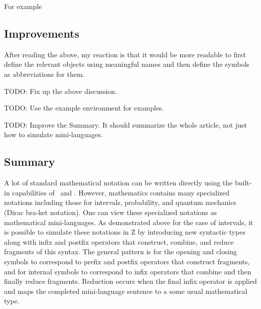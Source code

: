 \documentclass[11pt, oneside]{article}
\begin{document}
For example

\begin{zed}
	\zeroR \in \closedLowerBound \zeroR \intersectRightLeft \oneR \openUpperBound
\end{zed}

\subsection{Improvements}

After reading the above, my reaction is that it would be more readable to first define the relevant objects using meaningful names
and then define the symbols as abbreviations for them.

TODO: Fix up the above discussion.

TODO: Use the example environment for examples.

TODO: Improve the Summary. It should summarize the whole article, not just how to simulate mini-languages.

\subsection{Summary}

A lot of standard mathematical notation can be written directly using the built-in capabilities of \Zed\  and \fuzz.
However, mathematics contains many specialized notations including those for intervals, probability, and quantum mechanics (Dirac bra-ket notation).
One can view these specialized notations as mathematical mini-languages.
As demonstrated above for the case of intervals, it is possible to simulate these notations in Z by introducing new syntactic types along with infix and postfix operators that construct, combine, and reduce fragments of this syntax.
The general pattern is for the opening and closing symbols to correspond to prefix and postfix operators that
construct fragments, and for internal symbols to correspond to infix operators that combine and then finally 
reduce fragments.
Reduction occurs when the final infix operator is applied and maps the completed mini-language sentence to a 
some usual mathematical type.

\printbibliography
\end{document}
